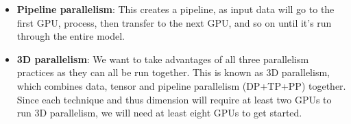 \begin{itemize}
\begin{itemize}
			\item \textbf{Pipeline parallelism}: This creates a pipeline, as input data will go to the first GPU, process, then transfer to the next GPU, and so on until it's run through the entire model. 
			\item \textbf{3D parallelism}: We want to take advantages of all three parallelism practices as they can all be run together. This is known as 3D parallelism, which combines data, tensor and pipeline parallelism (DP+TP+PP) together. Since each technique and thus dimension will require at least two GPUs to run 3D parallelism, we will need at least eight GPUs to get started. 
		\end{itemize}
\end{itemize}



